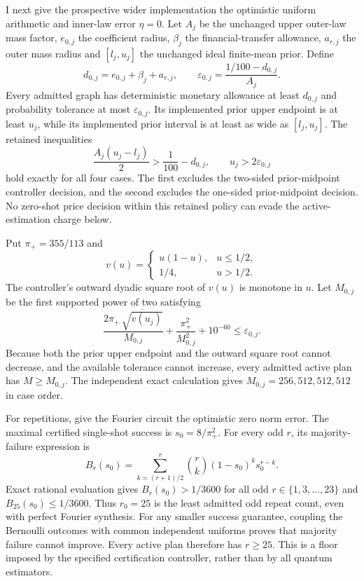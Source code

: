 \documentclass[11pt]{article}
\begin{document}
I next give the prospective wider implementation the optimistic uniform
arithmetic and inner-law error $\eta=0$. Let $A_j$ be the unchanged
upper outer-law mass factor, $e_{0,j}$ the coefficient radius,
$\beta_j$ the financial-transfer allowance, $a_{r,j}$ the outer
mass radius and $[l_j,u_j]$ the unchanged ideal finite-mean prior.
Define
\begin{equation}
 d_{0,j}=e_{0,j}+\beta_j+a_{r,j},\qquad
 \varepsilon_{0,j}=\frac{1/100-d_{0,j}}{A_j}.
\end{equation}
Every admitted graph has deterministic monetary allowance at least
$d_{0,j}$ and probability tolerance at most $\varepsilon_{0,j}$.
Its implemented prior upper endpoint is at least $u_j$, while its
implemented prior interval is at least as wide as $[l_j,u_j]$.
The retained inequalities
\begin{equation}
 \frac{A_j(u_j-l_j)}2>\frac1{100}-d_{0,j},\qquad
 u_j>2\varepsilon_{0,j}
\label{eq:raw-asymmetric-zero-shot-exclusions}
\end{equation}
hold exactly for all four cases. The first excludes the two-sided
prior-midpoint controller decision, and the second excludes the
one-sided prior-midpoint decision. No zero-shot price decision within
this retained policy can evade the active-estimation charge below.

Put $\pi_+=355/113$ and
\begin{equation}
 v(u)=\begin{cases}u(1-u),&u\leq1/2,\\1/4,&u>1/2.\end{cases}
\end{equation}
The controller's outward dyadic square root of $v(u)$ is monotone in
$u$. Let $M_{0,j}$ be the first supported power of two satisfying
\begin{equation}
 \frac{2\pi_+\,\overline{\sqrt{v(u_j)}}}{M_{0,j}}
       +\frac{\pi_+^2}{M_{0,j}^2}+10^{-60}
       \leq\varepsilon_{0,j}.
\end{equation}
Because both the prior upper endpoint and the outward square root
cannot decrease, and the available tolerance cannot increase, every
admitted active plan has $M\geq M_{0,j}$. The independent exact
calculation gives $M_{0,j}=256,512,512,512$ in case order.

For repetitions, give the Fourier circuit the optimistic zero norm
error. The maximal certified single-shot success is
$s_0=8/\pi_+^2$. For every odd $r$, its majority-failure expression is
\begin{equation}
 B_r(s_0)=\sum_{k=(r+1)/2}^{r}\binom rk(1-s_0)^ks_0^{r-k}.
\end{equation}
Exact rational evaluation gives $B_r(s_0)>1/3600$ for all odd
$r\in\{1,3,\ldots,23\}$ and $B_{25}(s_0)\leq1/3600$.
Thus $r_0=25$ is the least admitted odd repeat count, even with perfect
Fourier synthesis. For any smaller success guarantee, coupling the
Bernoulli outcomes with common independent uniforms proves that
majority failure cannot improve. Every active plan therefore has
$r\geq25$. This is a floor imposed by the specified certification
controller, rather than by all quantum estimators.
\end{document}
